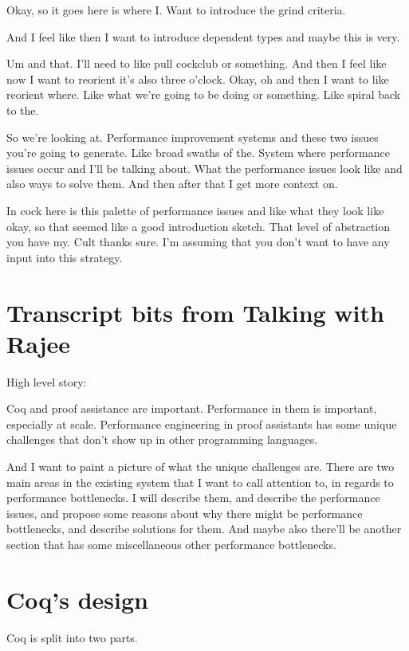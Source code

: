 \begin{subappendices}
Okay, so it goes here is where I. Want to introduce the grind criteria. 

And I feel like then I want to introduce dependent types and maybe this is very. 

Um and that. I'll need to like pull cockclub or something. And then I feel like now I want to reorient it's also three o'clock. Okay, oh and then I want to like reorient where. Like what we're going to be doing or something. Like spiral back to the. 

So we're looking at. Performance improvement systems and these two issues you're going to generate. Like broad swaths of the. System where performance issues occur and I'll be talking about. What the performance issues look like and also ways to solve them. And then after that I get more context on. 

In cock here is this palette of performance issues and like what they look like okay, so that seemed like a good introduction sketch. That level of abstraction you have my. Cult thanks sure. I'm assuming that you don't want to have any input into this strategy.


\section{Transcript bits from Talking with Rajee}
High level story:

Coq and proof assistance are important. Performance in them is important, especially at scale. Performance engineering in proof assistants has some unique challenges that don't show up in other programming languages.

And I want to paint a picture of what the unique challenges are.  There are two main areas in the existing system that I want to call attention to, in regards to performance bottlenecks.  I will describe them, and describe the performance issues, and propose some reasons about why there might be performance bottlenecks, and describe solutions for them. And maybe also there'll be another section that has some miscellaneous other performance bottlenecks.


\section{Coq's design}
Coq is split into two parts.


\end{subappendices}
